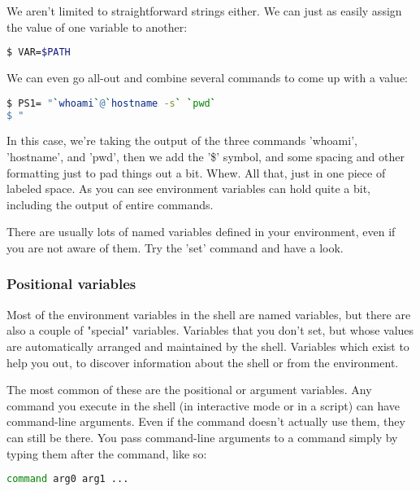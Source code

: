 We aren't limited to straightforward strings either. We can just as easily
assign the value of one variable to another:
\lstset{basicstyle=\scriptsize, numbers=left, captionpos=b, tabsize=4}
\begin{lstlisting}[caption=Assigning a simple value to a variable,language={bash},
xleftmargin=15pt,label=lst:Assigningasimplevaluetoavariable3]
$ VAR=$PATH
\end{lstlisting}

We can even go all-out and combine several commands to come up with a value:
\lstset{basicstyle=\scriptsize, numbers=left, captionpos=b, tabsize=4}
\begin{lstlisting}[caption=Assigning a combined value to a variable,language={bash},
xleftmargin=15pt,label=lst:Assigningacombinedvaluetoavariable4]
$ PS1= "`whoami`@`hostname -s` `pwd` 
$ "
\end{lstlisting}

In this case, we're taking the output of the three commands 'whoami',
'hostname', and 'pwd', then we add the '\$' symbol, and some spacing and other
formatting just to pad things out a bit. Whew. All that, just in one piece of
labeled space. As you can see environment variables can hold quite a bit,
including the output of entire commands.

There are usually lots of named variables defined in your environment, even if
you are not aware of them. Try the 'set' command and have a look.

\subsubsection{Positional variables}
Most of the environment variables in the shell are named variables, but there
are also a couple of "special" variables. Variables that you don't set, but
whose values are automatically arranged and maintained by the shell. Variables
which exist to help you out, to discover information about the shell or from
the environment.

The most common of these are the positional or argument variables. Any command
you execute in the shell (in interactive mode or in a script) can have
command-line arguments. Even if the command doesn't actually use them, they can
still be there. You pass command-line arguments to a command simply by typing
them after the command, like so:
\lstset{basicstyle=\scriptsize, numbers=left, captionpos=b, tabsize=4}
\begin{lstlisting}[language={bash},
xleftmargin=15pt]
command arg0 arg1 ...
\end{lstlisting}

